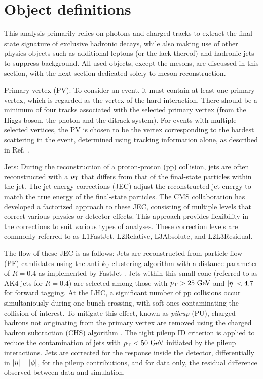\section{Object definitions}\label{sec:objects}

This analysis primarily relies on photons and charged tracks to extract the final state signature of exclusive hadronic decays, while also making use of other physics objects such as additional leptons (or the lack thereof) and hadronic jets to suppress background. All used objects, except the mesons, are discussed in this section, with the next section dedicated solely to meson reconstruction.
\vspace*{-6pt}
\begin{myitemlist}
    \item[Primary vertex (PV):] To consider an event, it must contain at least one primary vertex, which is regarded as the vertex of the hard interaction. There should be a minimum of four tracks associated with the selected primary vertex (from the Higgs boson, the photon and the ditrack system). For events with multiple selected vertices, the PV is chosen to be the vertex corresponding to the hardest scattering in the event, determined using tracking information alone, as described in Ref. \cite{Contardo:2015bmq}.

    \item[Jets:] During the reconstruction of a proton-proton (pp) collision, jets are often reconstructed with a $p_\text{T}$ that differs from that of the final-state particles within the jet. The jet energy corrections (JEC) adjust the reconstructed jet energy to match the true energy of the final-state particles. The CMS collaboration has developed a factorized approach to these JEC, consisting of multiple levels that correct various physics or detector effects. This approach provides flexibility in the corrections to suit various types of analyses. These correction levels are commonly referred to as L1FastJet, L2Relative, L3Absolute, and L2L3Residual.

    The flow of these JEC is as follows: Jets are reconstructed from particle flow (PF) candidates using the anti-$k_\text{T}$ clustering algorithm with a distance parameter of $R = 0.4$ as implemented by FastJet \cite{Cacciari:2011ma}. Jets within this small cone (referred to as AK4 jets for $R = 0.4$) are selected among those with $\pT > 25\ \GeV$ and $\left\lvert\eta\right\rvert < 4.7$ for forward tagging. At the LHC, a significant number of pp collisions occur simultaniously during one bunch crossing, with soft ones contaminating the collision of interest. To mitigate this effect, known as \textit{pileup} (PU), charged hadrons not originating from the primary vertex are removed using the charged hadron subtraction (CHS) algorithm \cite{CMS:2014ata, Perloff:2012wpa}. The tight pileup ID criterion is applied to reduce the contamination of jets with $p_\text{T} < 50\ \text{GeV}$ initiated by the pileup interactions. Jets are corrected for the response inside the detector, differentially in $\left\lvert\eta\right\rvert - \left\lvert\phi\right\rvert$, for the pileup contributions, and for data only, the residual difference observed between data and simulation.
    

\end{myitemlist}
